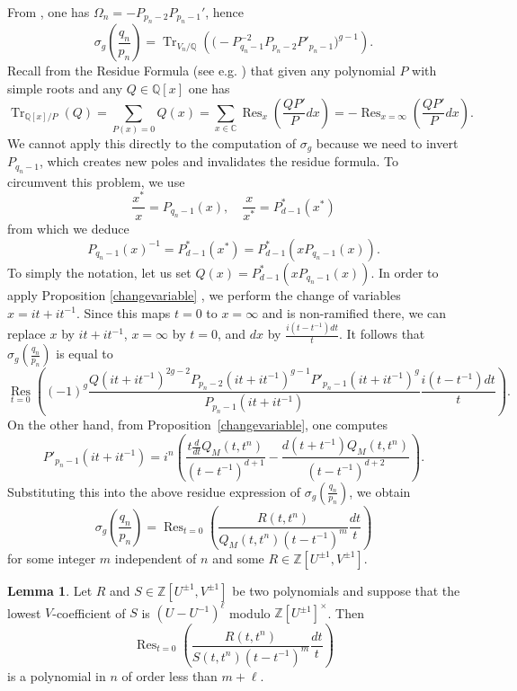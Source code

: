 \documentclass{amsart}
\newcommand{\Q}{\mathbb{Q}}
\newcommand{\Z}{\mathbb{Z}}
\newcommand{\C}{\mathbb{C}}
\DeclareMathOperator{\Tr}{Tr}
\DeclareMathOperator{\Res}{Res}
\theoremstyle{definition}
\newtheorem{Lemma}[Theorem]{Lemma}
\begin{document}
From \cite{S2P}, one has $\Omega_n=-P_{p_n-2}P_{p_n-1}'$, hence 
\begin{equation}\label{signature-trace}
 \sigma_g  \left(\frac{q_n}{p_n} \right)=
\Tr_{V_n/\Q}\left( \big(-P_{q_n-1}^{-2} P_{p_n-2} P'_{p_n-1}\big)^{g-1}\right).
\end{equation}
Recall from the Residue Formula (see e.g. \cite{G}) that given any polynomial $P$ with simple roots and any $Q\in \Q[x]$ one has
\begin{equation*}
 \Tr_{\Q[x]/P}(Q)=\sum_{P(x)=0}Q(x)=\sum_{x \in \C}\Res_x(\frac{QP'}{P}dx)=-\Res_{x=\infty}(\frac{QP'}{P}dx).
\end{equation*}
We cannot apply this directly to the computation of $\sigma_g$ because we need to invert $P_{q_n-1}$, which creates new poles and invalidates the residue formula. To circumvent this problem, we use
$$ \frac{x^*}{x}=P_{q_n-1}(x),\quad \frac{x}{x^*}=P^*_{d-1}(x^*)$$
from which we deduce 
$$P_{q_n-1}(x)^{-1}=P^*_{d-1}(x^*)=P^*_{d-1}(xP_{q_n-1}(x)).$$
To simply the notation, let us set $Q(x)=P^*_{d-1}(xP_{q_n-1}(x))$.
In order to apply Proposition \ref{changevariable} , we perform the change of variables $x=it+it^{-1}$. Since this maps $t=0$ to $x=\infty$ and is non-ramified there, we can replace $x$ by $it+it^{-1}$, $x=\infty$ by $t=0$, and $dx$ by $\frac{i(t-t^{-1})dt}{t}$. It follows that $\sigma_g(\frac{q_n}{p_n})$ is equal to  
\begin{equation*}
\underset{t=0}{\Res}\left(
(-1)^g\frac{Q(it+it^{-1})^{2g-2}P_{p_n-2}(it+it^{-1})^{g-1} P'_{p_n-1}(it+it^{-1})^{g}}
{P_{p_n-1}(it+it^{-1})}\frac{i(t-t^{-1})dt}{t}
\right).
\end{equation*}
On the other hand, from Proposition~\ref{changevariable}, one computes
\begin{equation}\label{Pderiv}
P'_{p_n-1}(it+it^{-1})=i^{n}\left(\frac{t\frac{d}{dt}Q_M(t,t^n)}{(t-t^{-1})^{d+1}}-\frac{d(t+t^{-1})Q_M(t,t^n)}{(t-t^{-1})^{d+2}}\right).
\end{equation}
Substituting this into the above residue expression of $\sigma_g(\frac{q_n}{p_n})$, we obtain 
\begin{equation}
\label{eqn.sres}
\sigma_g \left( \frac{q_n}{p_n} \right) = \Res_{t=0} \left( \frac{R(t,t^n)}{Q_M(t,t^n)(t-t^{-1})^m} \dfrac{dt}{t}\right)
\end{equation}
for some integer $m$ independent of $n$ and some $R\in \Z[U^{\pm1},V^{\pm 1}]$. 

\begin{Lemma}
\label{lem.RS}
Let $R$ and $S\in \Z[U^{\pm 1},V^{\pm 1}]$ be two polynomials and suppose that the lowest $V$-coefficient of $S$ is $(U-U^{-1})^\ell$ modulo $\Z[U^{\pm 1}]^\times$. Then 
$$\Res_{t=0} \left(\frac{R(t,t^n)}{S(t,t^n)(t-t^{-1})^m}\frac{dt}{t}\right)$$
is a polynomial in $n$ of order less than $m+\ell$.
\end{Lemma}
\end{document}
